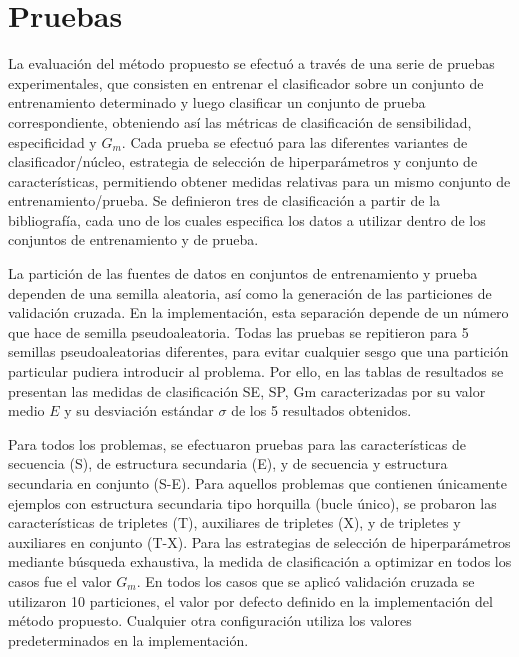 
\chapter{Pruebas}
La evaluación del método propuesto se efectuó a través de una serie de
pruebas experimentales, que consisten en entrenar el clasificador
sobre un conjunto de entrenamiento determinado y luego clasificar un
conjunto de prueba correspondiente, obteniendo así las métricas de
clasificación de sensibilidad, especificidad y $G_m$.  Cada prueba se
efectuó para las diferentes variantes de clasificador/núcleo,
estrategia de selección de hiperparámetros y conjunto de
características, permitiendo obtener medidas relativas para un mismo
conjunto de entrenamiento/prueba.  Se definieron tres  de
clasificación a partir de la bibliografía, cada uno de los cuales
especifica los datos a utilizar dentro de los conjuntos de
entrenamiento y de prueba.

La partición de las fuentes de datos en conjuntos de entrenamiento
y prueba dependen de una semilla aleatoria, así como la generación
de las particiones de validación cruzada. En la implementación, esta
separación depende de un número que hace de semilla pseudoaleatoria.
Todas las pruebas se repitieron para 5 semillas pseudoaleatorias
diferentes, para evitar cualquier sesgo
que una partición particular pudiera introducir al problema.
Por ello, en las tablas de resultados se presentan las medidas de
clasificación SE, SP, Gm caracterizadas por su valor medio $E$ y su
desviación estándar $\sigma$ de los 5 resultados
obtenidos.

Para todos los problemas, se efectuaron pruebas para las
características de secuencia (S), de estructura secundaria (E), y de
secuencia y estructura secundaria en conjunto (S-E).  Para aquellos
problemas que contienen únicamente ejemplos con estructura secundaria
tipo horquilla (bucle único), se probaron las características de
tripletes (T), auxiliares de tripletes (X), y de tripletes y
auxiliares en conjunto (T-X).
Para las estrategias de selección de hiperparámetros mediante búsqueda
exhaustiva, la medida de clasificación a optimizar en todos los casos
fue el valor $G_m$. En todos los casos que se aplicó validación
cruzada se utilizaron 10 particiones, el valor por defecto definido en
la implementación del método propuesto. Cualquier otra configuración
utiliza los valores predeterminados en la implementación.